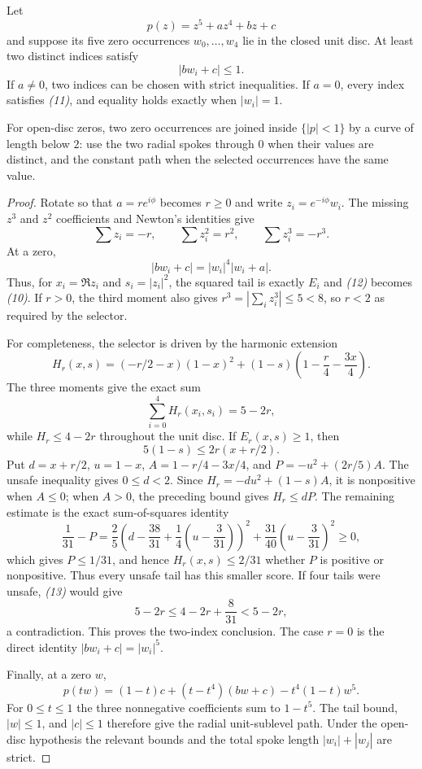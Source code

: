 \begin{theorem}
\label{thm:primitive-quintic-two-tail}
Let
\[
 p(z)=z^5+az^4+bz+c
\]
and suppose its five zero occurrences $w_0,\ldots,w_4$ lie in the closed unit
disc.  At least two distinct indices satisfy
\[
 |bw_i+c|\le1.                                    \tag{11}
\]
If $a\ne0$, two indices can be chosen with strict inequalities.  If $a=0$,
every index satisfies \emph{(11)}, and equality holds exactly when
$|w_i|=1$.

For open-disc zeros, two zero occurrences are joined inside $\{|p|<1\}$ by a
curve of length below $2$: use the two radial spokes through $0$ when their
values are distinct, and the constant path when the selected occurrences
have the same value.
\end{theorem}

\begin{proof}
Rotate so that $a=re^{i\phi}$ becomes $r\ge0$ and write
$z_i=e^{-i\phi}w_i$.  The missing $z^3$ and $z^2$ coefficients and Newton's
identities give
\[
 \sum z_i=-r,\qquad \sum z_i^2=r^2,\qquad
 \sum z_i^3=-r^3.                                 \tag{12}
\]
At a zero,
\[
 |bw_i+c|=|w_i|^4|w_i+a|.
\]
Thus, for $x_i=\Re z_i$ and $s_i=|z_i|^2$, the squared tail is exactly
$E_i$ and \emph{(12)} becomes \emph{(10)}.  If $r>0$, the third moment
also gives $r^3=|\sum_i z_i^3|\le5<8$, so $r<2$ as required by the
selector.

For completeness, the selector is driven by the harmonic extension
\[
 H_r(x,s)=(-r/2-x)(1-x)^2
 +(1-s)\left(1-\frac r4-\frac{3x}{4}\right).
\]
The three moments give the exact sum
\[
 \sum_{i=0}^4H_r(x_i,s_i)=5-2r,                  \tag{13}
\]
while $H_r\le4-2r$ throughout the unit disc.  If $E_r(x,s)\ge1$, then
\[
 5(1-s)\le2r(x+r/2).
\]
Put $d=x+r/2$, $u=1-x$, $A=1-r/4-3x/4$, and
$P=-u^2+(2r/5)A$.  The unsafe inequality gives $0\le d<2$.  Since
$H_r=-du^2+(1-s)A$, it is nonpositive when $A\le0$; when $A>0$,
the preceding bound gives $H_r\le dP$.  The remaining estimate is the exact
sum-of-squares identity
\[
 \frac1{31}-P
 =\frac25\left(d-\frac{38}{31}
               +\frac14(u-\frac3{31})\right)^2
  +\frac{31}{40}\left(u-\frac3{31}\right)^2\ge0,
\]
which gives $P\le1/31$, and hence $H_r(x,s)\le2/31$ whether $P$ is
positive or nonpositive.  Thus every unsafe tail has this smaller score.  If four tails were
unsafe, \emph{(13)} would give
\[
 5-2r\le4-2r+\frac8{31}<5-2r,
\]
a contradiction.  This proves the two-index conclusion.  The case $r=0$ is
the direct identity $|bw_i+c|=|w_i|^5$.

Finally, at a zero $w$,
\[
 p(tw)=(1-t)c+(t-t^4)(bw+c)-t^4(1-t)w^5.
\]
For $0\le t\le1$ the three nonnegative coefficients sum to $1-t^5$.
The tail bound, $|w|\le1$, and $|c|\le1$ therefore give the radial
unit-sublevel path.  Under the open-disc hypothesis the relevant bounds and
the total spoke length $|w_i|+|w_j|$ are strict.
\end{proof}

